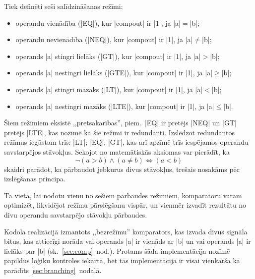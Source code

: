 	Tiek definēti seši salīdzināšanas režīmi:
	\begin{itemize}
		\item operandu vienādība (|EQ|), kur |compout| ir |1|, ja |a|$=$|b|;
		\item operandu nevienādība (|NEQ|), kur |compout| ir |1|, ja |a|$\neq$|b|;
		\item operands |a| stingri lielāks (|GT|), kur |compout| ir |1|, ja |a|$>$|b|;
		\item operands |a| nestingri lielāks (|GTE|), kur |compout| ir |1|, ja |a|$\geq$|b|;
		\item operands |a| stingri mazāks (|LT|), kur |compout| ir |1|, ja |a|$<$|b|;
		\item operands |a| nestingri mazāks (|LTE|), kur |compout| ir |1|, ja |a|$\leq$|b|.
	\end{itemize}
	
	Šiem režīmiem eksistē ,,pretsakarības'', piem.~|EQ| ir pretējs |NEQ| un
	|GT| pretējs |LTE|, kas nozīmē ka šie režīmi ir redundanti. Izslēdzot
	redundantos režīmus iegūstam trīs: |LT|; |EQ|; |GT|, kas arī apzīmē
	trīs iespējamos operandu savstarpējos stāvokļus.
	Sekojot no matemātiskās aksiomas var pierādīt, ka
	\[
		\neg (a>b) \land (a \neq b) \iff (a<b)
	\]
	skaidri parādot, ka pārbaudot jebkurus divus stāvokļus, trešais
	nosakāms pēc izslēgšanas principa.
	\pagebreak[3]
	
	Tā vietā, lai nodotu vienu no sešiem pārbaudes režīmiem, komparatoru
	varam optimizēt, likvidējot režīmu pārslēgšanu vispār, un vienmēr izvadīt
	rezultātu no divu operandu savstarpējo stāvokļu pārbaudes.
	
	Kodola realizācijā izmantots ,,bezrežīmu'' komparators, kas 
	izvada divus signāla bitus, kas attiecīgi norāda 
	vai operands |a| ir vienāds ar |b| 
	un vai operands |a| ir lielāks par |b| (sk.~\ref{sec:comp}~nod.).
	Protams šāda implementācija nozīmē papildus loģiku kontroles iekārtā,
	bet tās implementācija ir visai vienkārša kā parādīts
	\ref{sec:branching}~nodaļā.
